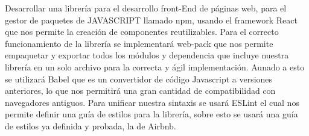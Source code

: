 Desarrollar una librería para el desarrollo front-End de páginas web, para el gestor de paquetes de JAVASCRIPT \cite{javascript} llamado npm, usando el framework React que nos permite la creación de componentes reutilizables. Para el correcto funcionamiento de la librería se implementará web-pack que nos permite empaquetar y exportar todos los módulos y dependencia que incluye nuestra librería en un solo archivo para la correcta y ágil implementación. Aunado a esto se utilizará Babel \cite{babel} que es un convertidor de código Javascript a versiones anteriores, lo que nos permitirá una gran cantidad de compatibilidad con navegadores antiguos. Para unificar nuestra sintaxis se usará ESLint el cual nos permite definir una guía de estilos para la librería, sobre esto se usará una guía de estilos ya definida y probada, la de Airbnb. 
\newpage
